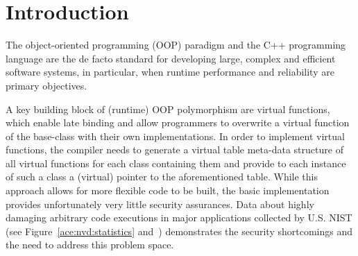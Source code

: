 \section{Introduction}
\label{chapter:Introduction}

The object-oriented programming (OOP) paradigm and the C++ programming language are the de facto standard for developing large, complex and efficient software systems, in particular, 
when runtime performance and reliability are primary objectives.

A key building block of (runtime) OOP polymorphism are virtual functions, which enable late binding and allow programmers to overwrite a virtual function of the base-class with their 
own implementations. In order to implement virtual functions, the compiler needs to generate a virtual table meta-data structure of all virtual functions for each class containing 
them and provide to each instance of such a class a (virtual) pointer to the aforementioned table. While this approach allows for more flexible code to be built, 
the basic implementation provides unfortunately very little security assurances. Data about highly damaging arbitrary code executions in major applications collected by U.S. NIST 
(see Figure~\ref{ace:nvd:statistics} and~\cite{NVD:ACE}) demonstrates the security shortcomings and the need to address this problem space.


